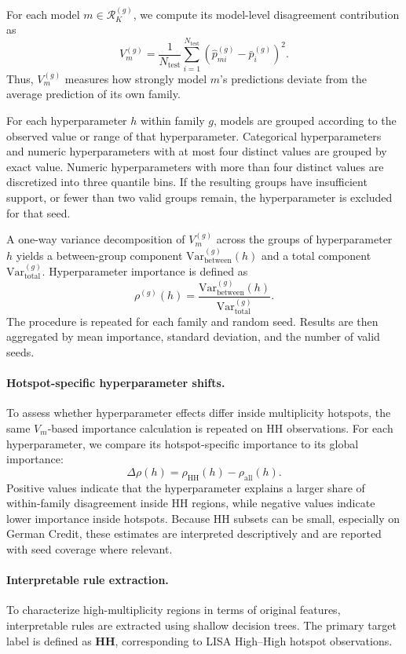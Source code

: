 For each model \(m \in \mathcal{R}^{(g)}_K\), we compute its model-level disagreement
contribution as
\[
V^{(g)}_m =
\frac{1}{N_{\mathrm{test}}}
\sum_{i=1}^{N_{\mathrm{test}}}
\left(
\hat{p}^{(g)}_{mi} - \bar{p}^{(g)}_i
\right)^2 .
\]
Thus, \(V^{(g)}_m\) measures how strongly model \(m\)'s predictions deviate from the
average prediction of its own family.

For each hyperparameter \(h\) within family \(g\), models are grouped according to the
observed value or range of that hyperparameter. Categorical hyperparameters and numeric
hyperparameters with at most four distinct values are grouped by exact value. Numeric
hyperparameters with more than four distinct values are discretized into three quantile
bins. If the resulting groups have insufficient support, or fewer than two valid groups
remain, the hyperparameter is excluded for that seed.

A one-way variance decomposition of \(V^{(g)}_m\) across the groups of hyperparameter
\(h\) yields a between-group component
\(\mathrm{Var}_{\mathrm{between}}^{(g)}(h)\) and a total component
\(\mathrm{Var}_{\mathrm{total}}^{(g)}\). Hyperparameter importance is defined as
\[
\rho^{(g)}(h)
=
\frac{\mathrm{Var}_{\mathrm{between}}^{(g)}(h)}
{\mathrm{Var}_{\mathrm{total}}^{(g)}}.
\]
The procedure is repeated for each family and random seed. Results are then aggregated by
mean importance, standard deviation, and the number of valid seeds.

\paragraph{Hotspot-specific hyperparameter shifts.}
To assess whether hyperparameter effects differ inside multiplicity hotspots, the same \(V_m\)-based importance calculation is repeated on HH observations. For each hyperparameter, we compare its hotspot-specific importance to its global importance:
\[
\Delta \rho(h)
=
\rho_{\mathrm{HH}}(h) - \rho_{\mathrm{all}}(h).
\]
Positive values indicate that the hyperparameter explains a larger share of within-family disagreement inside HH regions, while negative values indicate lower importance inside hotspots. Because HH subsets can be small, especially on German Credit, these estimates are interpreted descriptively and are reported with seed coverage where relevant.


\paragraph{Interpretable rule extraction.}
To characterize high-multiplicity regions in terms of original features, interpretable rules
are extracted using shallow decision trees. The primary target label is defined as
\textbf{HH}, corresponding to LISA High--High hotspot observations.

